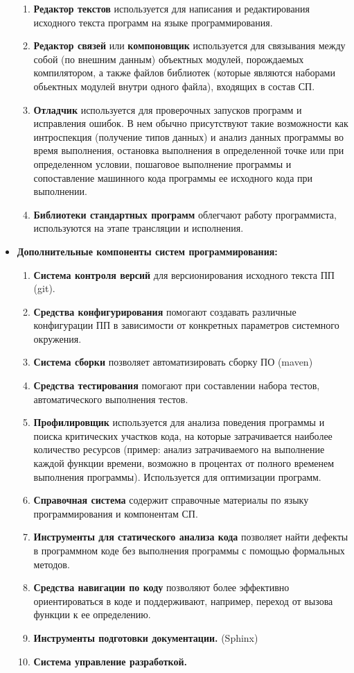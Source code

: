 \begin{itemize}
\begin{enumerate}
        \item \textbf{Редактор текстов} используется для написания и редактирования исходного текста программ на языке программирования.
        \item \textbf{Редактор связей} или \textbf{компоновщик} используется для связывания между собой (по внешним данным) объектных модулей, порождаемых компилятором,
        а также файлов библиотек (которые являются наборами обьектных модулей внутри одного файла), входящих в состав СП.
        \item \textbf{Отладчик} используется для проверочных запусков программ и исправления ошибок. В нем обычно присутствуют такие возможности как интроспекция (получение типов данных) и анализ данных программы во время выполнения,
        остановка выполнения в определенной точке или при определенном условии, пошаговое выполнение программы и сопоставление машинного кода программы ее исходного кода при выполнении.
        \item \textbf{Библиотеки стандартных программ} облегчают работу программиста, используются на этапе трансляции и исполнения.
    \end{enumerate}
    \item \textbf{Дополнительные компоненты систем программирования:}
    \begin{enumerate}
        \item \textbf{Система контроля версий} для версионирования исходного текста ПП (git).
        \item \textbf{Средства конфигурирования} помогают создавать различные конфигурации ПП в зависимости от конкретных параметров системного окружения.
        \item \textbf{Система сборки} позволяет автоматизировать сборку ПО (maven)
        \item \textbf{Средства тестирования} помогают при составлении набора тестов, автоматического выполнения тестов.
        \item \textbf{Профилировщик} используется для анализа поведения программы и поиска критических участков кода, на которые затрачивается наиболее количество ресурсов (пример: анализ затрачиваемого на выполнение каждой функции времени, возможно в процентах от полного временем выполнения программы). Используется для оптимизации программ.
        \item \textbf{Справочная система} содержит справочные материалы по языку программирования и компонентам СП.
        \item \textbf{Инструменты для статического анализа кода} позволяет найти дефекты в программном коде без выполнения программы с помощью формальных методов.
        \item \textbf{Средства навигации по коду} позволяют более эффективно ориентироваться в коде и поддерживают, например, переход от вызова функции к ее определению.
        \item \textbf{Инструменты подготовки документации.} (Sphinx)
        \item \textbf{Система управление разработкой.}
    \end{enumerate}
\end{itemize}

